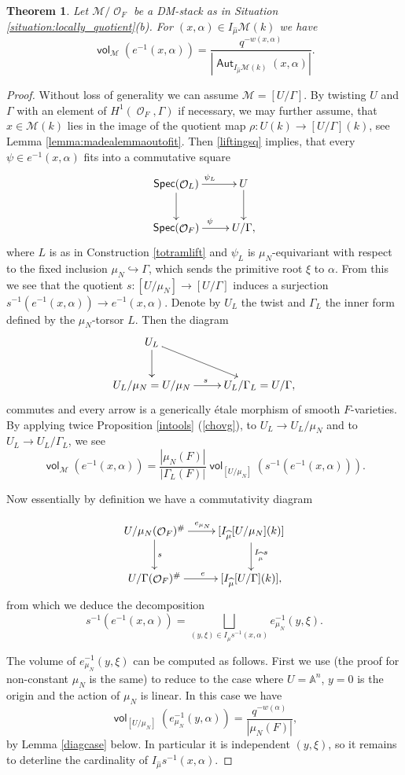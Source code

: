 \documentclass{article}
\DeclareMathOperator{\Aut}{\mathsf{Aut}}
\newcommand{\Mc}{\mathcal{M}}
\DeclareMathOperator{\vol}{\mathsf{vol}}
\DeclareMathOperator{\Spec}{\mathsf{Spec}}
\DeclareMathOperator{\Oo}{\mathcal{O}}
\newcommand{\BA}{{\mathbb{A}}}
\theoremstyle{definition}
\theoremstyle{plain}
\newtheorem{theorem}[definition]{Theorem}
\begin{document}
\begin{theorem}\label{thm:volume}
Let $\Mc/\Oo_F$ be a DM-stack as in Situation \ref{situation:locally_quotient}(b). For $(x,\alpha) \in I_{\widehat{\mu}}\Mc(k)$ we have
$$\vol_{\Mc}\left(e^{-1}(x,\alpha)\right) = \frac{q^{-w(x,\alpha)}}{|\Aut_{I_{\widehat \mu}\Mc(k)}(x,\alpha)|}.$$
\end{theorem}

\begin{proof} Without loss of generality we can assume $\Mc =[U/\Gamma]$. By twisting $U$ and $\Gamma$ with an element of $H^1(\Oo_F,\Gamma)$ if necessary, we may further assume, that $x\in\Mc(k)$ lies in the image of the quotient map $\rho:U(k) \to [U/\Gamma](k)$, see Lemma \ref{lemma:madealemmaoutofit}. Then \eqref{liftingsq} implies, that every $\psi \in e^{-1}(x,\alpha)$ fits into a commutative square
\[ \xymatrix{ \Spec(\Oo_L) \ar[d] \ar[r]^{\psi_L} & U \ar[d] \\
\Spec(\Oo_F) \ar[r]^{\psi} & U/\Gamma,
}
\]
where $L$ is as in Construction \ref{totramlift} and $\psi_L$ is $\mu_N$-equivariant with respect to the fixed inclusion $\mu_N \hookrightarrow \Gamma$, which sends the primitive root $\xi$ to $\alpha$. From this we see that the quotient $s:[U/\mu_N] \to [U/\Gamma]$ induces a surjection $s^{-1}(e^{-1}(x,\alpha)) \to e^{-1}(x,\alpha)$. Denote by $U_L$ the twist  and $\Gamma_L$ the inner form defined by the $\mu_N$-torsor $L$. Then the diagram
\[ \xymatrix{ U_L \ar[rd] \ar[d] &  \\
U_L/\mu_N = U/\mu_N \ar[r]^s & U_L / \Gamma_L = U/\Gamma ,
}
\]
commutes and every arrow is a generically \'etale morphism of smooth $F$-varieties. By applying twice Proposition \ref{intools} (\ref{chovg}), to $U_L \to U_L/\mu_N$ and to $U_L \to U_L/\Gamma_L$, we see
\[ \vol_{\Mc}(e^{-1}(x,\alpha)) = \frac{|\mu_N(F)|}{|\Gamma_L(F)|}\vol_{[U/\mu_N]}(s^{-1}(e^{-1}(x,\alpha))). \]

Now essentially by definition we have a commutativity diagram

\[ \xymatrix{  U/\mu_N(\Oo_F)^\# \ar[r]^{e_{\mu_N}} \ar[d]^s  &  [I_{\widehat{\mu}}[U/\mu_N](k)]       \ar[d]^{ I_{\widehat{\mu}}s}  \\
U/\Gamma(\Oo_F)^\# \ar[r]^e & [I_{\widehat{\mu}}[U/\Gamma](k)],           }\]
from which we deduce the decomposition 
\[s^{-1}(e^{-1}(x,\alpha)) = \bigsqcup_{(y,\xi) \in I_{\widehat{\mu}}s^{-1}(x,\alpha)} e_{\mu_N}^{-1}(y,\xi).\]

The volume of $e_{\mu_N}^{-1}(y,\xi)$ can be computed as follows. First we use \cite[Lemma A.6]{gwz} (the proof for non-constant $\mu_N$ is the same) to reduce to the case where $U=\BA^n$, $y=0$ is the origin and the action of $\mu_N$ is linear. In this case we have 
\[ \vol_{[U/\mu_N]}(e_{\mu_N}^{-1}(y,\alpha)) = \frac{q^{-w(\alpha)}}{|\mu_N(F)|},\]
by Lemma \ref{diagcase} below. In particular it is independent $(y,\xi)$, so it remains to deterline the cardinality of $I_{\widehat{\mu}}s^{-1}(x,\alpha)$. 


\end{proof}
\end{document}
